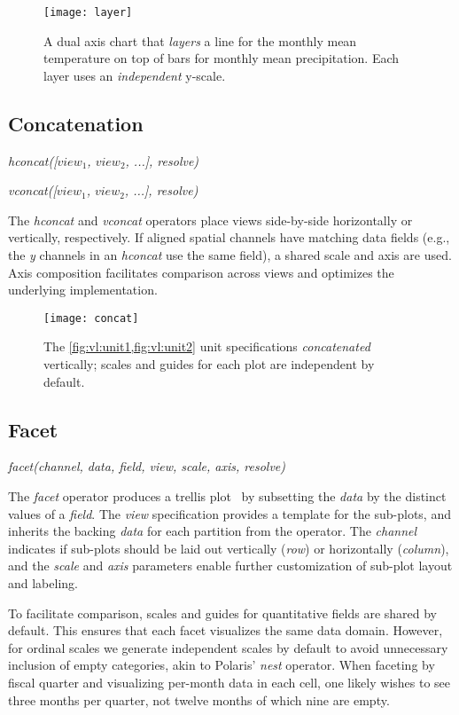 \begin{figure*}[h!]
  \centering
  \texttt{[image: layer]}
  \caption{A dual axis chart that \emph{layers} a line for the monthly mean
  temperature on top of bars for monthly mean precipitation. Each layer uses an
  \emph{independent} y-scale.}
  \label{fig:vl:layer}
\end{figure*}

\subsection{Concatenation}

\centerline{
  \emph{hconcat([$view_1$, $view_2$, ...], resolve)}
}
\centerline{
  \emph{vconcat([$view_1$, $view_2$, ...], resolve)}
}

The \emph{hconcat} and \emph{vconcat} operators place views side-by-side
horizontally or vertically, respectively. If aligned spatial channels have
matching data fields (e.g., the \emph{y} channels in an \emph{hconcat} use the
same field), a shared scale and axis are used. Axis composition facilitates
comparison across views and optimizes the underlying implementation.

\begin{figure*}[h!]
  \centering
  \texttt{[image: concat]}
  \caption{The \cref{fig:vl:unit1,fig:vl:unit2} unit specifications
  \emph{concatenated} vertically; scales and guides for each
  plot are independent by default.}
  \label{fig:vl:concat}
\end{figure*}

\subsection{Facet}

\centerline{
  \emph{facet(channel, data, field, view, scale, axis, resolve)}
}


The \emph{facet} operator produces a trellis plot~\cite{becker:trellis} by
subsetting the \emph{data} by the distinct values of a \emph{field}. The
\emph{view} specification provides a template for the sub-plots, and inherits
the backing \emph{data} for each partition from the operator. The \emph{channel}
indicates if sub-plots should be laid out vertically (\emph{row}) or
horizontally (\emph{column}), and the \emph{scale} and \emph{axis} parameters
enable further customization of sub-plot layout and labeling.

To facilitate comparison, scales and guides for quantitative fields are shared
by default. This ensures that each facet visualizes the same data domain.
However, for ordinal scales we generate independent scales by default to avoid
unnecessary inclusion of empty categories, akin to Polaris' \emph{nest}
operator. When faceting by fiscal quarter and visualizing per-month data in
each cell, one likely wishes to see three months per quarter, not twelve
months of which nine are empty.


